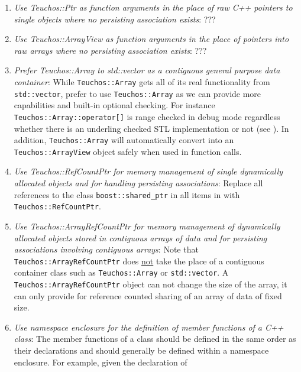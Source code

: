 \begin{enumerate}
{}\item\textit{Use Teuchos::Ptr as function arguments in the place of raw C++
pointers to single objects where no persisting association exists}: ???

{}\item\textit{Use Teuchos::ArrayView as function arguments in the place of
pointers into raw arrays where no persisting association exists}: ???

{}\item\textit{Prefer Teuchos::Array to std::vector as a contiguous general
purpose data container}: While {}\texttt{Teuchos::\-Array} gets all of its
real functionality from {}\texttt{std::\-vector}, prefer to use
{}\texttt{Teuchos::\-Array} as we can provide more capabilities and built-in
optional checking.  For instance {}\texttt{Teuchos::\-Array::\-operator[]} is
range checked in debug mode regardless whether there is an underling checked
STL implementation or not (see {}\cite[Item 83]{C++CodingStandards05}).  In
addition, {}\texttt{Teuchos\-::Array} will automatically convert into an
{}\texttt{Teuchos\-::ArrayView} object safely when used in function calls.

{}\item\textit{Use Teuchos::RefCountPtr for memory management of single
dynamically allocated objects and for handling persisting
{}\cite{RefCountPtrBeginnersGuide} associations}: Replace all references to
the class {}\texttt{boost::\-shared\_ptr} in all items in
{}\cite{C++CodingStandards05} with {}\texttt{Teuchos::\-RefCountPtr}.

{}\item\textit{Use Teuchos::ArrayRefCountPtr for memory management of
dynamically allocated objects stored in contiguous arrays of data and for
persisting associations involving contiguous arrays}: Note that
{}\texttt{Teuchos::ArrayRefCountPtr} does {}\underline{not} take the place of
a contiguous container class such as {}\texttt{Teuchos::\-Array} or
{}\texttt{std::\-vector}.  A {}\texttt{Teuchos::ArrayRefCountPtr} object can
not change the size of the array, it can only provide for reference counted
sharing of an array of data of fixed size.

{}\item\textit{Use namespace enclosure for the definition of member functions
of a C++ class}: The member functions of a class should be defined in the same
order as their declarations and should generally be defined within a namespace
enclosure.  For example, given the declaration of


\end{enumerate}
